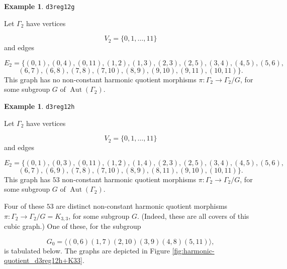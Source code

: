 \documentclass[12pt,letterpaper]{article}
\theoremstyle{definition}
\newtheorem{example}[theorem]{Example}
\DeclareMathOperator{\Aut}{Aut}
\begin{document}
\begin{example}%
\label{example:d3reg12g}
  {\tt d3reg12g}\newline
{\rm  
Let $\Gamma_2$ have vertices

\[
V_2=\{0,1,\dots,11\}
\]
and edges

\[
E_2 = \{
(0, 1), (0, 4), (0, 11), (1, 2), (1, 3), (2, 3), (2, 5), (3, 4), (4, 5), (5, 6), 
\]
\[
(6, 7), (6, 8), (7, 8), (7, 10), (8, 9), (9, 10), (9, 11), (10, 11)
\}.
\]
This graph has no non-constant harmonic quotient
morphisms $\pi: \Gamma_2\to \Gamma_2/G$, for some subgroup
$G$ of $\Aut(\Gamma_2)$.

}
\end{example}



\begin{example}%
\label{example:d3reg12h}
  {\tt d3reg12h}\newline
{\rm  
Let $\Gamma_2$ have vertices

\[
V_2=\{0,1,\dots,11\}
\]
and edges

\[
E_2 = \{
(0, 1), (0, 3), (0, 11), (1, 2), (1, 4), (2, 3), (2, 5), (3, 4), (4, 5), (5, 6),
\]
\[
 (6, 7), (6, 9), (7, 8), (7, 10), (8, 9), (8, 11), (9, 10), (10, 11)
\}.
\]
This graph has $53$ non-constant harmonic quotient
morphisms $\pi: \Gamma_2\to \Gamma_2/G$, for some subgroup
$G$ of $\Aut(\Gamma_2)$.

Four of these $53$ are distinct non-constant harmonic quotient
morphisms $\pi: \Gamma_2\to \Gamma_2/G=K_{3,3}$, for some subgroup $G$.
(Indeed, these are all covers of this cubic graph.)
One of these, for the subgroup

\[
G_0=\langle (0,6)(1,7)(2,10)(3,9)(4,8)(5,11) \rangle,
\]
is tabulated below. The graphs are depicted in
Figure \ref{fig:harmonic-quotient_d3reg12h+K33}.

}
\end{example}
\end{document}
